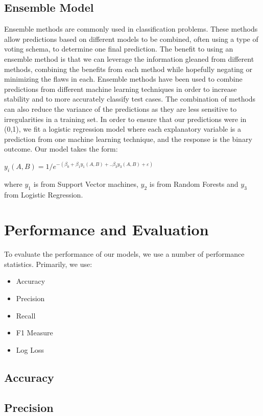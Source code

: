 \documentclass{article}
\begin{document}
\begin{multicols}{2}
	 \subsection{Ensemble Model}
	 Ensemble methods are commonly used in classification problems. These methods allow predictions based on different models to be combined, often using a type of voting schema, to determine one final prediction. The benefit to using an ensemble method is that we can
leverage the information gleaned from different methods, combining the benefits from each method while hopefully negating or minimizing the flaws in each. Ensemble methods have been used to combine predictions from different machine learning techniques in order to increase stability and to more accurately classify test cases. The combination of methods can also reduce the variance of the predictions as they are less sensitive to irregularities in a training set.\cite{4}
	In order to ensure that our predictions were in (0,1), we fit a logistic regression model where each explanatory variable is a prediction from one machine learning technique, and the response is the binary outcome.
Our model takes the form:
\begin{center}
$y_i(A,B) = 1/e^{-(\beta_0 + \beta_1y_1(A,B) +..\beta_3y_3(A,B) + \varepsilon )}$
\end{center}
where $y_1$ is from Support Vector machines, $y_2$ is from Random Forests and $y_3$ from Logistic Regression.
	
	\section{Performance and Evaluation}
	To evaluate the performance of our models, we use a number of performance statistics. Primarily, we use:
	
	\begin{itemize}
	\item Accuracy
	\item Precision
	\item Recall
	\item F1 Measure
	\item Log Loss
	\end{itemize}
	
	\subsection{Accuracy}
	\subsection{Precision}

\end{multicols}
\end{document}
